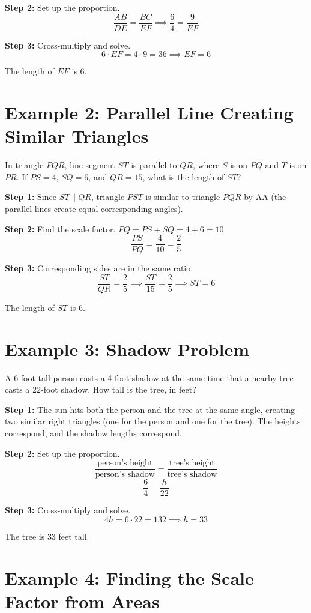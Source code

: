 \documentclass[14pt]{extarticle}
\begin{document}
\textbf{Step 2:} Set up the proportion.
\[
\frac{AB}{DE} = \frac{BC}{EF} \implies \frac{6}{4} = \frac{9}{EF}
\]

\textbf{Step 3:} Cross-multiply and solve.
\[
6 \cdot EF = 4 \cdot 9 = 36 \implies EF = 6
\]

The length of \(EF\) is \(\boxed{6}\).

\section*{Example 2: Parallel Line Creating Similar Triangles}

In triangle \(PQR\), line segment \(ST\) is parallel to \(QR\), where \(S\) is on \(PQ\) and \(T\) is on \(PR\). If \(PS = 4\), \(SQ = 6\), and \(QR = 15\), what is the length of \(ST\)?

\textbf{Step 1:} Since \(ST \parallel QR\), triangle \(PST\) is similar to triangle \(PQR\) by AA (the parallel lines create equal corresponding angles).

\textbf{Step 2:} Find the scale factor. \(PQ = PS + SQ = 4 + 6 = 10\).
\[
\frac{PS}{PQ} = \frac{4}{10} = \frac{2}{5}
\]

\textbf{Step 3:} Corresponding sides are in the same ratio.
\[
\frac{ST}{QR} = \frac{2}{5} \implies \frac{ST}{15} = \frac{2}{5} \implies ST = 6
\]

The length of \(ST\) is \(\boxed{6}\).

\section*{Example 3: Shadow Problem}

A 6-foot-tall person casts a 4-foot shadow at the same time that a nearby tree casts a 22-foot shadow. How tall is the tree, in feet?

\textbf{Step 1:} The sun hits both the person and the tree at the same angle, creating two similar right triangles (one for the person and one for the tree). The heights correspond, and the shadow lengths correspond.

\textbf{Step 2:} Set up the proportion.
\[
\frac{\text{person's height}}{\text{person's shadow}} = \frac{\text{tree's height}}{\text{tree's shadow}}
\]
\[
\frac{6}{4} = \frac{h}{22}
\]

\textbf{Step 3:} Cross-multiply and solve.
\[
4h = 6 \cdot 22 = 132 \implies h = 33
\]

The tree is \(\boxed{33}\) feet tall.

\section*{Example 4: Finding the Scale Factor from Areas}
\end{document}
